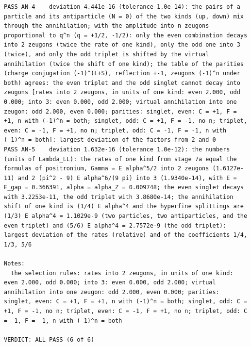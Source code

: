 \documentclass[
  10pt,
]{article}
\begin{document}
\begin{verbatim}
PASS AN-4    deviation 4.441e-16 (tolerance 1.0e-14): the pairs of a particle and its antiparticle (N = 0) of the two kinds (up, down) mix through the annihilation; with the amplitude into n zeugons proportional to q^n (q = +1/2, -1/2): only the even combination decays into 2 zeugons (twice the rate of one kind), only the odd one into 3 (twice), and only the odd triplet is shifted by the virtual annihilation (twice the shift of one kind); the table of the parities (charge conjugation (-1)^(L+S), reflection +-1, zeugons (-1)^n under both) agrees: the even triplet and the odd singlet cannot decay into zeugons [rates into 2 zeugons, in units of one kind: even 2.000, odd 0.000; into 3: even 0.000, odd 2.000; virtual annihilation into one zeugon: odd 2.000, even 0.000; parities: singlet, even: C = +1, F = +1, n with (-1)^n = both; singlet, odd: C = +1, F = -1, no n; triplet, even: C = -1, F = +1, no n; triplet, odd: C = -1, F = -1, n with (-1)^n = both]: largest deviation of the factors from 2 and 0
PASS AN-5    deviation 1.632e-16 (tolerance 1.0e-12): the numbers (units of Lambda_LL): the rates of one kind from stage 7a equal the formulas of positronium, Gamma = E alpha^5/2 into 2 zeugons (1.6127e-11) and 2 (pi^2 - 9) E alpha^6/(9 pi) into 3 (1.9340e-14), with E = E_gap = 0.366391, alpha = alpha_Z = 0.009748; the even singlet decays with 3.2253e-11, the odd triplet with 3.8680e-14; the annihilation shift of one kind is (1/4) E alpha^4 and the hyperfine splittings are (1/3) E alpha^4 = 1.1029e-9 (two particles, two antiparticles, and the even triplet) and (5/6) E alpha^4 = 2.7572e-9 (the odd triplet): largest deviation of the rates (relative) and of the coefficients 1/4, 1/3, 5/6

Notes:
  the selection rules: rates into 2 zeugons, in units of one kind: even 2.000, odd 0.000; into 3: even 0.000, odd 2.000; virtual annihilation into one zeugon: odd 2.000, even 0.000; parities: singlet, even: C = +1, F = +1, n with (-1)^n = both; singlet, odd: C = +1, F = -1, no n; triplet, even: C = -1, F = +1, no n; triplet, odd: C = -1, F = -1, n with (-1)^n = both

VERDICT: ALL PASS (6 of 6)
\end{verbatim}
\end{document}
